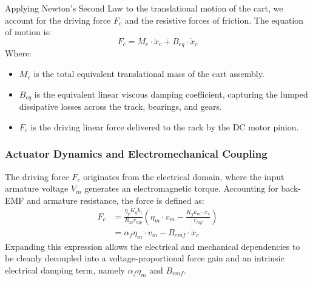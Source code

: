 \documentclass[11pt,a4paper]{article}
\begin{document}
Applying Newton’s Second Law to the translational motion of the cart, we account for the driving force $F_c$ and the resistive forces of friction. The equation of motion is:
\begin{equation}
    F_c = M_e \cdot \ddot{x}_c + B_{eq} \cdot \dot{x}_c
\end{equation}
Where:
\begin{itemize}
    \item $M_e$ is the total equivalent translational mass of the cart assembly.
    \item $B_{eq}$ is the equivalent linear viscous damping coefficient, capturing the lumped dissipative losses across the track, bearings, and gears.
    \item $F_c$ is the driving linear force delivered to the rack by the DC motor pinion.
\end{itemize}

\subsubsection{Actuator Dynamics and Electromechanical Coupling}\label{subsub:cart_actuator}
The driving force $F_c$ originates from the electrical domain, where the input armature voltage $V_m$ generates an electromagnetic torque. Accounting for back-EMF and armature resistance, the force is defined as:
\begin{equation}
    \begin{aligned}
        F_c &= \frac{\eta_g  K_g k_t}{R_m r_{mp}} \left( \eta_m \cdot v_m - \frac{K_g k_m \cdot \dot{x}_c}{r_{mp}} \right)\\
        &= \alpha_f \eta_m \cdot v_m - B_{emf} \cdot \dot{x}_c
    \end{aligned}
\end{equation}
Expanding this expression allows the electrical and mechanical dependencies to be cleanly decoupled into a voltage-proportional force gain and an intrinsic electrical damping term, namely $\alpha_f \eta_m$ and $B_{emf}$.
\end{document}

